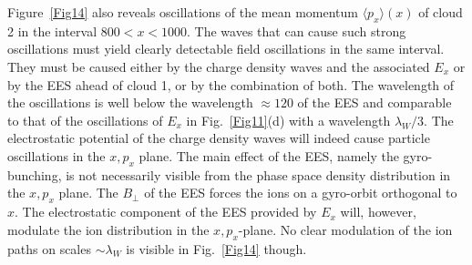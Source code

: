 \documentclass[structabstract]{aa}
\begin{document}
Figure~\ref{Fig14} also reveals oscillations of the mean momentum $\langle 
p_x \rangle (x)$ of cloud 2 in the interval $800 < x < 1000$. The waves
that can cause such strong oscillations must yield clearly detectable field 
oscillations in the same interval. They must be caused either by the charge 
density waves and the associated $E_x$ or by the EES ahead of cloud 1, or 
by the combination of both. The wavelength of the oscillations is well below 
the wavelength $\approx 120$ of the EES and comparable to that of the 
oscillations of $E_x$ in Fig.~\ref{Fig11}(d) with a wavelength $\lambda_W/3$. 
The electrostatic potential of the charge density waves will indeed cause 
particle oscillations in the $x,p_x$ plane. The main effect of the EES, 
namely the gyro-bunching, is not necessarily visible from the phase space 
density distribution in the $x,p_x$ plane. The $B_\perp$ of the EES forces 
the ions on a gyro-orbit orthogonal to $x$. The electrostatic component of
the EES provided by $E_x$ will, however, modulate the ion distribution in 
the $x,p_x$-plane. No clear modulation of the ion paths on scales $\sim
\lambda_W$ is visible in Fig.~\ref{Fig14} though. 
\end{document}
